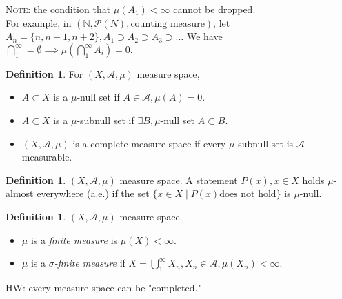 \documentclass{report}
\newcommand{\N}{\mathbb{N}}
\newcommand{\fancyem}[1]{\underline{\textsc{#1}}}
\theoremstyle{definition}
\newtheorem{definition}[theorem]{Definition}
\theoremstyle{remark}
\begin{document}
\fancyem{Note:} the condition that $\mu(A_1) < \infty$ cannot be dropped. \\
For example,
in $(\N, \mathcal{P}(N), \text{counting measure})$, let $A_n = \{n, n+1, n+2\}, A_1 \supset A_2 \supset A_3 \supset \ldots$ We have $\bigcap_1^\infty = \emptyset \implies \mu\left(\bigcap_1^\infty A_i \right) = 0.$

\begin{definition}
For $(X,  \mathcal{A}, \mu)$ measure space,
\begin{itemize}
\item
$A \subset X$ is a $\mu$-null set if $A \in \mathcal{A}, \mu(A)= 0.$
\item
$A \subset X$ is a $\mu$-subnull set if $\exists B, \mu$-null set $A \subset B.$
\item
$(X,  \mathcal{A}, \mu)$ is a complete measure space if every $\mu$-subnull set is $\mathcal{A}$-measurable.
\end{itemize}
\end{definition}

\begin{definition}$(X,  \mathcal{A}, \mu)$ measure space.
A statement $P(x), x \in X$ holds $\mu$-almost everywhere (a.e.) if the set $\{x \in X \mid P(x) \text{does not hold}\}$ is $\mu$-null.
\end{definition}

\begin{definition}$(X,  \mathcal{A}, \mu)$ measure space.
\begin{itemize}
\item
	$\mu$ is a \emph{finite measure} is $\mu(X) < \infty.$
\item
	$\mu$ is a \emph{$\sigma$-finite measure} if $X = \bigcup_1^\infty X_n, X_n \in \mathcal{A}, \mu(X_n) < \infty.$
\end{itemize}
\end{definition}
HW: every measure space can be "completed."
\end{document}
